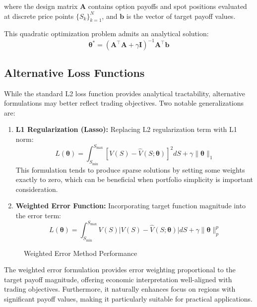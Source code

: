 \documentclass[12pt]{article}
\begin{document}
where the design matrix \( \mathbf{A} \) contains option payoffs and spot positions
evaluated at discrete price points \( \{S_k\}_{k=1}^N \), and \( \mathbf{b} \) is
the vector of target payoff values.

This quadratic optimization problem admits an analytical solution:
\begin{equation}
\boldsymbol{\theta}^* = 
    (\mathbf{A}^\top \mathbf{A} + \gamma \mathbf{I})^{-1} 
    \mathbf{A}^\top \mathbf{b}
\end{equation}

\subsection{Alternative Loss Functions}
While the standard L2 loss function provides analytical tractability, alternative 
formulations may better reflect trading objectives. Two notable generalizations are:

\begin{enumerate}
    \item \textbf{L1 Regularization (Lasso):} Replacing L2 regularization term with L1 norm:
    \begin{equation}
        L(\boldsymbol{\theta}) = 
            \int_{S_{\min}}^{S_{\max}} 
                \left[ V(S) - \hat{V}(S;\boldsymbol{\theta}) \right]^2 dS + 
            \gamma \|\boldsymbol{\theta}\|_1
    \end{equation}
    This formulation tends to produce sparse solutions by setting some weights exactly 
    to zero, which can be beneficial when portfolio simplicity is important consideration.

    \item \textbf{Weighted Error Function:} Incorporating target function magnitude 
    into the error term:
    \begin{equation}
        L(\boldsymbol{\theta}) = 
            \int_{S_{\min}}^{S_{\max}} 
                V(S) \Big| V(S) - \hat{V}(S;\boldsymbol{\theta}) \Big| dS + 
            \gamma \|\boldsymbol{\theta}\|_p^p
    \end{equation}
\end{enumerate}

\begin{figure}[htbp]
\centering

\caption{Weighted Error Method Performance}
\label{fig:weighted}
\end{figure}

The weighted error formulation provides error weighting proportional to the target payoff magnitude, 
offering economic interpretation well-aligned with trading objectives. Furthermore, it 
naturally enhances focus on regions with significant payoff values, making it particularly 
suitable for practical applications.
\end{document}
